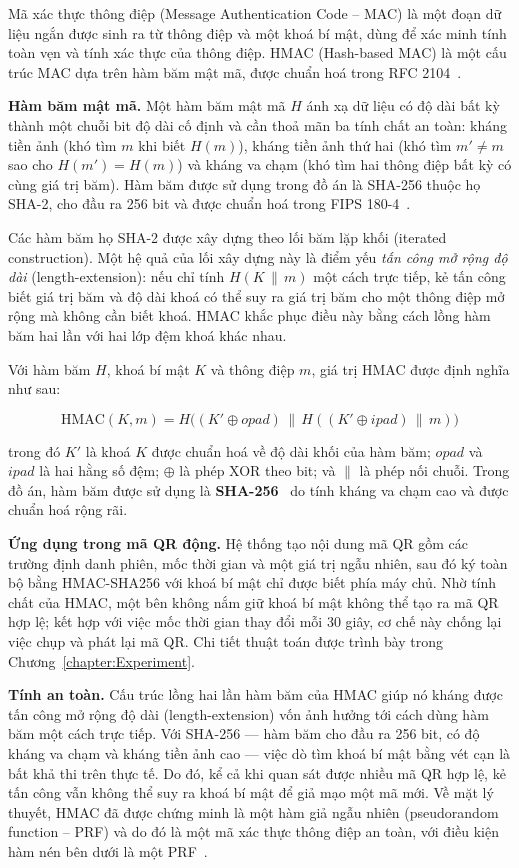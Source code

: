 \documentclass[../main.tex]{subfiles}
\begin{document}
Mã xác thực thông điệp (Message Authentication Code -- MAC) là một đoạn dữ liệu ngắn
được sinh ra từ thông điệp và một khoá bí mật, dùng để xác minh tính toàn vẹn và tính
xác thực của thông điệp. HMAC (Hash-based MAC) là một cấu trúc MAC dựa trên hàm băm mật
mã, được chuẩn hoá trong RFC 2104~\cite{rfc2104}.

\textbf{Hàm băm mật mã.} Một hàm băm mật mã $H$ ánh xạ dữ liệu có độ dài bất kỳ thành một chuỗi
bit độ dài cố định và cần thoả mãn ba tính chất an toàn: kháng tiền ảnh (khó tìm $m$ khi biết
$H(m)$), kháng tiền ảnh thứ hai (khó tìm $m' \neq m$ sao cho $H(m') = H(m)$) và kháng va chạm
(khó tìm hai thông điệp bất kỳ có cùng giá trị băm). Hàm băm được sử dụng trong đồ án là
SHA-256 thuộc họ SHA-2, cho đầu ra 256 bit và được chuẩn hoá trong FIPS 180-4~\cite{fips180}.

Các hàm băm họ SHA-2 được xây dựng theo lối băm lặp khối (iterated construction). Một hệ quả
của lối xây dựng này là điểm yếu \textit{tấn công mở rộng độ dài} (length-extension): nếu chỉ
tính $H(K \,\|\, m)$ một cách trực tiếp, kẻ tấn công biết giá trị băm và độ dài khoá có thể suy
ra giá trị băm cho một thông điệp mở rộng mà không cần biết khoá. HMAC khắc phục điều này bằng
cách lồng hàm băm hai lần với hai lớp đệm khoá khác nhau.

Với hàm băm $H$, khoá bí mật $K$ và thông điệp $m$, giá trị HMAC được định nghĩa như sau:

\begin{equation}
\text{HMAC}(K, m) = H\big( (K' \oplus opad) \,\|\, H((K' \oplus ipad) \,\|\, m) \big)
\label{eq:hmac}
\end{equation}

trong đó $K'$ là khoá $K$ được chuẩn hoá về độ dài khối của hàm băm; $opad$ và $ipad$ là
hai hằng số đệm; $\oplus$ là phép XOR theo bit; và $\|$ là phép nối chuỗi. Trong đồ án,
hàm băm được sử dụng là \textbf{SHA-256}~\cite{fips180} do tính kháng va chạm cao và được
chuẩn hoá rộng rãi.

\textbf{Ứng dụng trong mã QR động.} Hệ thống tạo nội dung mã QR gồm các trường định danh
phiên, mốc thời gian và một giá trị ngẫu nhiên, sau đó ký toàn bộ bằng HMAC-SHA256 với
khoá bí mật chỉ được biết phía máy chủ. Nhờ tính chất của HMAC, một bên không nắm giữ
khoá bí mật không thể tạo ra mã QR hợp lệ; kết hợp với việc mốc thời gian thay đổi mỗi
30 giây, cơ chế này chống lại việc chụp và phát lại mã QR. Chi tiết thuật toán được trình
bày trong Chương~\ref{chapter:Experiment}.

\textbf{Tính an toàn.} Cấu trúc lồng hai lần hàm băm của HMAC giúp nó kháng được tấn công mở
rộng độ dài (length-extension) vốn ảnh hưởng tới cách dùng hàm băm một cách trực tiếp. Với
SHA-256 --- hàm băm cho đầu ra 256 bit, có độ kháng va chạm và kháng tiền ảnh cao --- việc dò
tìm khoá bí mật bằng vét cạn là bất khả thi trên thực tế. Do đó, kể cả khi quan sát được nhiều
mã QR hợp lệ, kẻ tấn công vẫn không thể suy ra khoá bí mật để giả mạo một mã mới. Về mặt lý
thuyết, HMAC đã được chứng minh là một hàm giả ngẫu nhiên (pseudorandom function -- PRF) và do
đó là một mã xác thực thông điệp an toàn, với điều kiện hàm nén bên dưới là một
PRF~\cite{bellare1996hmac}.
\end{document}
